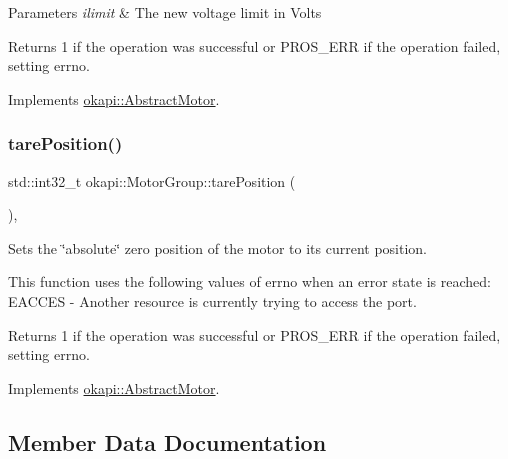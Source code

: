 \begin{DoxyParams}{Parameters}
{\em ilimit} & The new voltage limit in Volts \\
\hline
\end{DoxyParams}
\begin{DoxyReturn}{Returns}
1 if the operation was successful or P\+R\+O\+S\+\_\+\+E\+RR if the operation failed, setting errno. 
\end{DoxyReturn}


Implements \mbox{\hyperlink{classokapi_1_1AbstractMotor_a2f33faf946b99cd34e9a591ccc33d644}{okapi\+::\+Abstract\+Motor}}.

\mbox{\label{classokapi_1_1MotorGroup_a59aef8ea3c212e3466b67631978e47eb}} 
\subsubsection{\texorpdfstring{tarePosition()}{tarePosition()}}
{\footnotesize\ttfamily std\+::int32\+\_\+t okapi\+::\+Motor\+Group\+::tare\+Position (\begin{DoxyParamCaption}{ }\end{DoxyParamCaption})\hspace{0.3cm}{\ttfamily [override]}, {\ttfamily [virtual]}}

Sets the \char`\"{}absolute\char`\"{} zero position of the motor to its current position.

This function uses the following values of errno when an error state is reached\+: E\+A\+C\+C\+ES -\/ Another resource is currently trying to access the port.

\begin{DoxyReturn}{Returns}
1 if the operation was successful or P\+R\+O\+S\+\_\+\+E\+RR if the operation failed, setting errno. 
\end{DoxyReturn}


Implements \mbox{\hyperlink{classokapi_1_1AbstractMotor_ac36edbc92db85a11adcfee56275de15b}{okapi\+::\+Abstract\+Motor}}.



\subsection{Member Data Documentation}
\mbox{\label{classokapi_1_1MotorGroup_a025b488e3877fc4b0aa032c57f6ba1d4}} 
